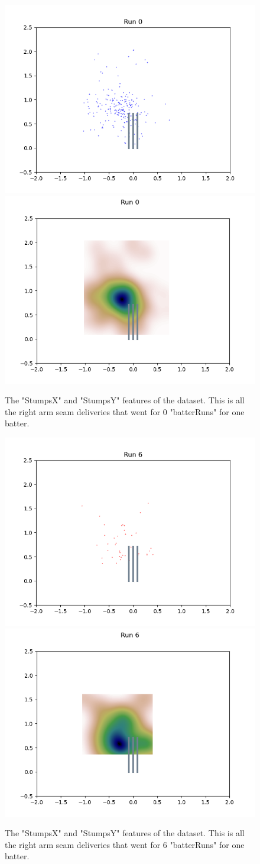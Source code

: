 \documentclass[12pt,a4paper]{report}
\theoremstyle{definition}
\begin{document}
\begin{figure}[H]
    \centering
    \includegraphics[width=0.49\linewidth]{jos_buttler_0_runs_right_arm_seam_stumps.png}
    \includegraphics[width=0.49\linewidth]{jos_buttler_0_runs_right_arm_seam_stumps_heat_map.png}
    \caption{The "StumpsX" and "StumpsY" features of the dataset. This is all the right arm seam deliveries that went for 0 "batterRuns" for one batter.}
    \label{fig:StumpsXY0Runs}
\end{figure}

\begin{figure}[H]
    \centering
    \includegraphics[width=0.49\linewidth]{jos_buttler_6_runs_right_arm_seam_stumps.png}
    \includegraphics[width=0.49\linewidth]{jos_buttler_6_runs_right_arm_seam_stumps_heat_map.png}
    \caption{The "StumpsX" and "StumpsY" features of the dataset. This is all the right arm seam deliveries that went for 6 "batterRuns" for one batter.}
    \label{fig:StumpsXY6Runs}
\end{figure}
\end{document}
